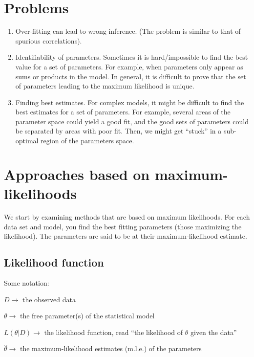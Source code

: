 \documentclass[
  letterpaper,
  DIV=11,
  numbers=noendperiod]{scrreprt}
\begin{document}
\section{Problems}\label{problems}

\begin{enumerate}
\def\labelenumi{\arabic{enumi}.}
\item
  Over-fitting can lead to wrong inference. (The problem is similar to
  that of spurious correlations).
\item
  Identifiability of parameters. Sometimes it is hard/impossible to find
  the best value for a set of parameters. For example, when parameters
  only appear as sums or products in the model. In general, it is
  difficult to prove that the set of parameters leading to the maximum
  likelihood is unique.
\item
  Finding best estimates. For complex models, it might be difficult to
  find the best estimates for a set of parameters. For example, several
  areas of the parameter space could yield a good fit, and the good sets
  of parameters could be separated by areas with poor fit. Then, we
  might get ``stuck'' in a sub-optimal region of the parameters space.
\end{enumerate}

\section{Approaches based on
maximum-likelihoods}\label{approaches-based-on-maximum-likelihoods}

We start by examining methods that are based on maximum likelihoods. For
each data set and model, you find the best fitting parameters (those
maximizing the likelihood). The parameters are said to be at their
maximum-likelihood estimate.

\subsection{Likelihood function}\label{likelihood-function}

Some notation:

\(D \to\) the observed data

\(\theta \to\) the free parameter(s) of the statistical model

\(L(\theta \vert D) \to\) the likelihood function, read ``the likelihood
of \(\theta\) given the data''

\(\hat{\theta} \to\) the maximum-likelihood estimates (m.l.e.) of the
parameters
\end{document}
